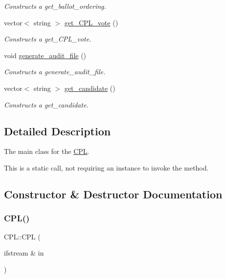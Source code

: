 \begin{DoxyCompactItemize}
\begin{DoxyCompactList}\small\item\em Constructs a get\+\_\+ballot\+\_\+ordering. \end{DoxyCompactList}\item 
vector$<$ string $>$ \hyperlink{classCPL_a3794df539bec96057658c15dad899b6b}{get\+\_\+\+C\+P\+L\+\_\+vote} ()
\begin{DoxyCompactList}\small\item\em Constructs a get\+\_\+\+C\+P\+L\+\_\+vote. \end{DoxyCompactList}\item 
void \hyperlink{classCPL_a12dff0af3da970b81ff2f69159fad58d}{generate\+\_\+audit\+\_\+file} ()
\begin{DoxyCompactList}\small\item\em Constructs a generate\+\_\+audit\+\_\+file. \end{DoxyCompactList}\item 
vector$<$ string $>$ \hyperlink{classCPL_ac06cdb1d7cf39353e228c15da25a54a5}{get\+\_\+candidate} ()
\begin{DoxyCompactList}\small\item\em Constructs a get\+\_\+candidate. \end{DoxyCompactList}\end{DoxyCompactItemize}


\subsection{Detailed Description}
The main class for the \hyperlink{classCPL}{C\+PL}. 

This is a static call, not requiring an instance to invoke the method. 

\subsection{Constructor \& Destructor Documentation}
\mbox{\label{classCPL_ac3a4ce447f08fa90208091138bbd2682}} 
\subsubsection{\texorpdfstring{C\+P\+L()}{CPL()}}
{\footnotesize\ttfamily C\+P\+L\+::\+C\+PL (\begin{DoxyParamCaption}\item[{ifstream \&}]{in }\end{DoxyParamCaption})}



